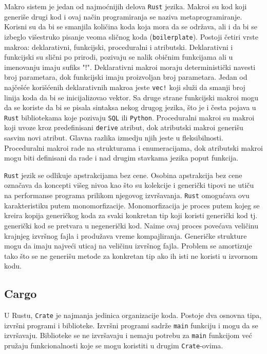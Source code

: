 \documentclass[11pt]{article}
\begin{document}
Makro sistem je jedan od najmoćnijih delova \verb|Rust| jezika. Makroi su kod koji generiše drugi kod i ovaj 
način programiranja se naziva metaprogramiranje. 
Korisni su da bi se smanjila količina koda koja mora da se održava, ali i da bi se izbeglo višestruko pisanje 
veoma sličnog koda (\verb|boilerplate|). Postoji četiri vrste makroa: deklarativni, funkcijski, proceduralni i atributski. 
Deklarativni i funkcijski su slični po prirodi, pozivaju se nalik običnim funkcijama ali u imenovanju imaju sufiks "!".
Deklarativni makroi moraju deterministički navesti broj parametara, dok funkcijski imaju proizvoljan broj parametara.
Jedan od najčešće korišćenih deklarativnih makroa jeste \verb|vec!| koji služi da smanji broj linija koda da bi se 
inicijalizovao vektor. Sa druge strane funkcijski makroi mogu da se koriste da bi se pisala sintaksa nekog drugog jezika, 
što je i česta pojava u \verb|Rust| bibliotekama koje pozivaju \verb|SQL| ili \verb|Python|.
Proceduralni makroi su makroi koji uvoze kroz predefinisani \verb|derive| atribut, dok atributski makroi generišu sasvim 
novi atribut. Glavna razlika izmedju njih jeste u fleksibilnosti. Proceduralni makroi rade na strukturama i enumeracijama,
dok atributski makroi mogu biti definisani da rade i nad drugim stavkama jezika poput funkcija.

\verb|Rust| jezik se odlikuje apstrakcijama bez cene. Osobina apstrakcija bez cene označava da koncepti 
višeg nivoa kao što su kolekcije i generički tipovi ne utiču na performanse programa prilikom njegovog izvršavanja.
\verb|Rust| omogućava ovu karakteristiku putem monomorfizacije. Monomorfizacija je proces putem kojeg se kreira 
kopija generičkog koda za svaki konkretan tip koji koristi generički kod tj. generički kod se pretvara u 
negenerički kod. Naime ovaj proces povećava veličinu krajnjeg izvršnog fajla i produžava vreme kompajliranja.
Generičke strukture mogu da imaju najveći uticaj na veličinu izvršnog fajla. Problem se amortizuje 
tako što se ne generišu metode za konkretan tip ako ih isti ne koristi u izvornom kodu.


\newpage
\subsection{Cargo}

U Rustu, \verb|Crate| je najmanja jedinica organizacije koda. Postoje dva osnovna tipa, izvršni programi i biblioteke.
Izvršni programi sadrže \verb|main| funkciju i mogu da se izvršavaju. Biblioteke se ne izvršavaju i nemaju potrebu za \verb|main|
funkcijom već pružaju funkcionalnosti koje se mogu koristiti u drugim \verb|Crate|-ovima. 
\end{document}

